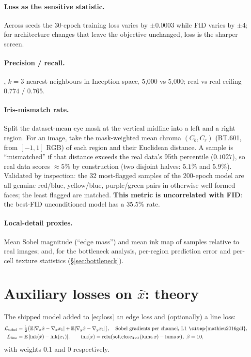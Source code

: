 \documentclass[11pt]{article}
\newcommand{\E}{\mathbb{E}}
\newcommand{\xh}{\hat{x}}
\begin{document}
\paragraph{Loss as the sensitive statistic.} Across seeds the 30-epoch training loss
varies by $\pm0.0003$ while FID varies by $\pm4$; for architecture changes that leave
the objective unchanged, loss is the sharper screen.

\paragraph{Precision / recall.} \citet{kynkaanniemi2019pr}, $k=3$ nearest neighbours in
Inception space, 5{,}000 vs 5{,}000; real-vs-real ceiling $0.774$ / $0.765$.

\paragraph{Iris-mismatch rate.}\label{sec:eyemetric} Split the dataset-mean eye mask at
the vertical midline into a left and a right region. For an image, take the
mask-weighted mean chroma $(C_b,C_r)$ (BT.601, from $[-1,1]$ RGB) of each region and
their Euclidean distance. A sample is ``mismatched'' if that distance exceeds the real
data's 95th percentile ($0.1027$), so real data scores $\approx5\%$ by construction
(two disjoint halves: $5.1\%$ and $5.9\%$). Validated by inspection: the 32 most-flagged
samples of the 200-epoch model are all genuine red/blue, yellow/blue, purple/green pairs
in otherwise well-formed faces; the least flagged are matched. \textbf{This metric is
uncorrelated with FID}: the best-FID unconditioned model has a $35.5\%$ rate.

\paragraph{Local-detail proxies.} Mean Sobel magnitude (``edge mass'') and mean ink map
of samples relative to real images; and, for the bottleneck analysis, per-region
prediction error and per-cell texture statistics (\S\ref{sec:bottleneck}).

\section{Auxiliary losses on $\xh$: theory}\label{sec:theory}

The shipped model added to \eqref{eq:loss} an edge loss and (optionally) a line loss:
\begin{align}
\mathcal L_{\text{sobel}}&=\tfrac12\bigl(\E|\nabla_x\xh-\nabla_x x_1|+\E|\nabla_y\xh-\nabla_y x_1|\bigr),
\quad\text{Sobel gradients per channel, L1 \citep{mathieu2016gdl}},\\
\mathcal L_{\text{line}}&=\E\,|\mathrm{ink}(\xh)-\mathrm{ink}(x_1)|,\qquad
\mathrm{ink}(x)=\mathrm{relu}\bigl(\mathrm{softclose}_{3\times3}(\mathrm{luma}\,x)-\mathrm{luma}\,x\bigr),\ \beta=10,
\end{align}
with weights $0.1$ and $0$ respectively.
\end{document}
